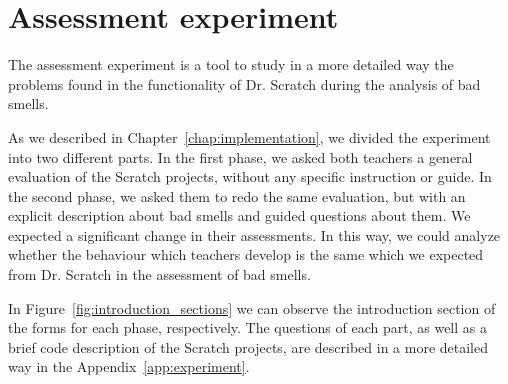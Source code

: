 \section{Assessment experiment}
\label{sec:results_experiment}

The assessment experiment is a tool to study in a more detailed way the problems found in the functionality of Dr. Scratch during the analysis of bad smells. 

As we described in Chapter~\ref{chap:implementation}, we divided the experiment into two different parts. In the first phase, we asked both teachers a general evaluation of the Scratch projects, without any specific instruction or guide. In the second phase, we asked them to redo the same evaluation, but with an explicit description about bad smells and guided questions about them. We expected a significant change in their assessments. In this way, we could analyze whether the behaviour which teachers develop is the same which we expected from Dr. Scratch in the assessment of bad smells. 

In Figure~\ref{fig:introduction_sections} we can observe the introduction section of the forms for each phase, respectively.  The questions of each part, as well as a brief code description of the Scratch projects, are described in a more detailed way in the Appendix~\ref{app:experiment}.

